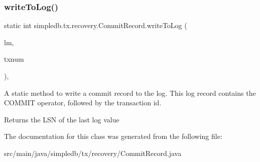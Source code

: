 \subsubsection{\texorpdfstring{write\+To\+Log()}{writeToLog()}}
{\footnotesize\ttfamily static int simpledb.\+tx.\+recovery.\+Commit\+Record.\+write\+To\+Log (\begin{DoxyParamCaption}\item[{\hyperlink{classsimpledb_1_1log_1_1LogMgr}{Log\+Mgr}}]{lm,  }\item[{int}]{txnum }\end{DoxyParamCaption})\hspace{0.3cm}{\ttfamily [inline]}, {\ttfamily [static]}}

A static method to write a commit record to the log. This log record contains the C\+O\+M\+M\+IT operator, followed by the transaction id. \begin{DoxyReturn}{Returns}
the L\+SN of the last log value 
\end{DoxyReturn}


The documentation for this class was generated from the following file\+:\begin{DoxyCompactItemize}
\item 
src/main/java/simpledb/tx/recovery/Commit\+Record.\+java\end{DoxyCompactItemize}
